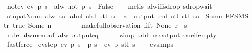 \begin{isabellebody}
\isamarkupfalse%
\ not{\isacharunderscore}ev{\isacharcolon}\ {\isachardoublequoteopen}ev\ p\ s\ {\isasymLongrightarrow}\ alw\ {\isacharparenleft}not\ p{\isacharparenright}\ s\ {\isasymLongrightarrow}\ False{\isachardoublequoteclose}\isanewline
%
\isadelimproof
\ \ %
\endisadelimproof
%
\isatagproof
{}\isamarkupfalse%
\ {\isacharparenleft}metis\ alw{\isacharunderscore}iff{\isacharunderscore}sdrop\ sdrop{\isacharunderscore}wait{\isacharparenright}%
\endisatagproof
{\isafoldproof}%
%
\isadelimproof
\isanewline
%
\endisadelimproof
\isanewline
{}\isamarkupfalse%
\ stop{\isacharunderscore}at{\isacharunderscore}None{\isacharcolon}\ {\isachardoublequoteopen}alw\ {\isacharparenleft}{\isasymlambda}xs{\isachardot}\ label\ {\isacharparenleft}shd\ {\isacharparenleft}stl\ xs{\isacharparenright}{\isacharparenright}\ {\isacharequal}\ a\ {\isasymlongrightarrow}\ output\ {\isacharparenleft}shd\ {\isacharparenleft}stl\ {\isacharparenleft}stl\ xs{\isacharparenright}{\isacharparenright}{\isacharparenright}\ {\isasymnoteq}\ {\isacharbrackleft}Some\ {\isacharparenleft}EFSM{\isachardot}Str\ {\isacharprime}{\isacharprime}true{\isacharprime}{\isacharprime}{\isacharparenright}{\isacharcomma}\ Some\ n{\isacharbrackright}{\isacharparenright}\isanewline
\ \ \ \ \ \ \ \ {\isacharparenleft}make{\isacharunderscore}full{\isacharunderscore}observation\ lift\ None\ r\ {\isacharbrackleft}{\isacharbrackright}\ s{\isacharparenright}{\isachardoublequoteclose}\isanewline
%
\isadelimproof
\ \ %
\endisadelimproof
%
\isatagproof
{}\isamarkupfalse%
\ {\isacharparenleft}rule\ alw{\isacharunderscore}mono{\isacharbrackleft}of\ {\isachardoublequoteopen}alw\ {\isacharparenleft}output{\isacharunderscore}eq\ {\isacharbrackleft}{\isacharbrackright}{\isacharparenright}{\isachardoublequoteclose}{\isacharbrackright}{\isacharparenright}\isanewline
\ \ \ \isamarkupfalse%
\ {\isacharparenleft}simp\ add{\isacharcolon}\ no{\isacharunderscore}output{\isacharunderscore}none{\isacharunderscore}if{\isacharunderscore}empty{\isacharparenright}\isanewline
\ \ \isamarkupfalse%
\ fastforce%
\endisatagproof
{\isafoldproof}%
%
\isadelimproof
\isanewline
%
\endisadelimproof
\isanewline
{}\isamarkupfalse%
\ ev{\isacharunderscore}step{\isacharcolon}\ {\isachardoublequoteopen}ev\ p\ s\ {\isacharequal}\ p\ s\ {\isasymor}\ ev\ p\ {\isacharparenleft}stl\ s{\isacharparenright}{\isachardoublequoteclose}\isanewline
%
\isadelimproof
\ \ %
\endisadelimproof
%
\isatagproof
{}\isamarkupfalse%
\ ev{\isachardot}simps\ \isamarkupfalse%

\end{isabellebody}
